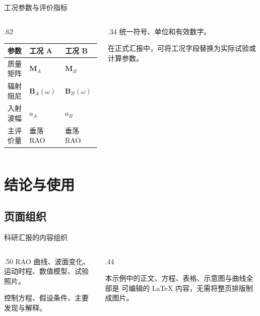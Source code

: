 \documentclass[UTF8,aspectratio=169]{beamer}
\begin{document}
\begin{frame}[t]{工况参数与评价指标}
  \begin{columns}[T,onlytextwidth]
    \begin{column}{.62\textwidth}
      {
      \begin{tabularx}{\linewidth}{@{}lXX@{}}
        \toprule
        参数 & 工况 A & 工况 B\\
        \midrule
        质量矩阵 & $\mathbf{M}_{A}$ & $\mathbf{M}_{B}$\\
        辐射阻尼 & $\mathbf{B}_{A}(\omega)$ & $\mathbf{B}_{B}(\omega)$\\
        入射波幅 & $a_A$ & $a_B$\\
        主评价量 & 垂荡 RAO & 垂荡 RAO\\
        \bottomrule
      \end{tabularx}}
    \end{column}
    \begin{column}{.34\textwidth}
      统一符号、单位和有效数字。

      \medskip
      在正式汇报中，可将工况字段替换为实际试验或计算参数。
    \end{column}
  \end{columns}
\end{frame}

\section{结论与使用}
\subsection{页面组织}

\begin{frame}[t]{科研汇报的内容组织}

  \begin{columns}[T,onlytextwidth]
    \begin{column}{.50\textwidth}
      RAO 曲线、波面变化、运动时程、数值模型、试验照片。

      \medskip
      控制方程、假设条件、主要发现与解释。
    \end{column}
    \begin{column}{.44\textwidth}
      \begin{ResearchNote}
        本示例中的正文、方程、表格、示意图与曲线全部是
        可编辑的 LaTeX 内容，无需将整页排版制成图片。
      \end{ResearchNote}
    \end{column}
  \end{columns}
\end{frame}

\end{document}
